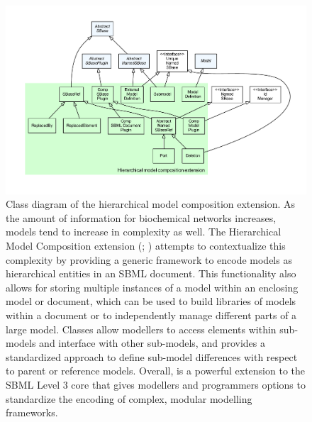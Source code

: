 \begin{figure}[hb]
 \centering
 \vspace*{2ex}
 \includegraphics[width=\textwidth]{../../../extensions/comp/doc/img/type_hierarchy.pdf}
 \caption[Class diagram of the hierarchical model composition extension]{Class diagram of the hierarchical model composition extension. As the amount of information for biochemical networks increases, models tend to
increase in complexity as well. The Hierarchical Model Composition extension (; \cite{smith2010})
attempts to contextualize this complexity by providing a generic framework to encode
models as hierarchical entities in an SBML document. This functionality also allows
for storing multiple instances of a model within an enclosing model or document, which
can be used to build libraries of models within a document or to independently manage
different parts of a large model. Classes allow modellers to access elements within
sub-models and interface with other sub-models, and  provides a standardized approach
to define sub-model differences with respect to parent or reference models. Overall, 
is a powerful extension to the SBML Level 3 core that gives modellers and programmers
options to standardize the encoding of complex, modular modelling frameworks. 
}
 \label{fig:comp}
\end{figure}

